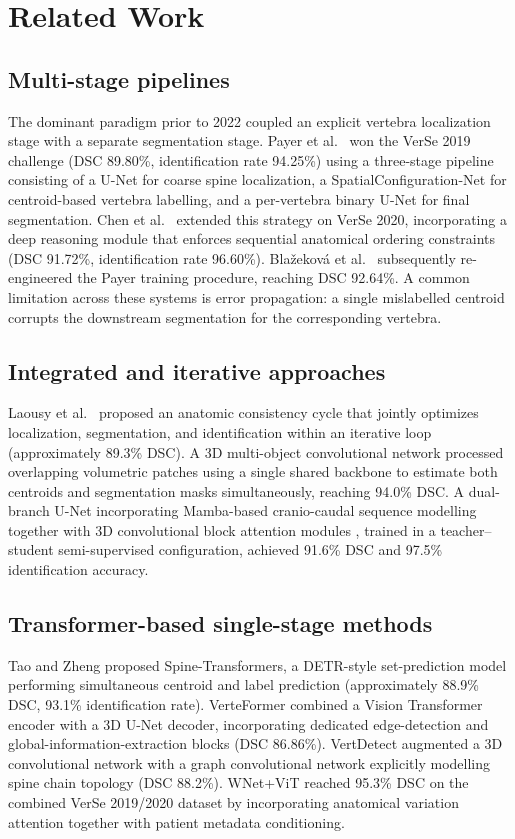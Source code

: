\documentclass[preprint,12pt,3p]{elsarticle}
\begin{document}
\section{Related Work}
\label{sec:related}

\subsection{Multi-stage pipelines}
The dominant paradigm prior to 2022 coupled an explicit vertebra localization stage with a separate segmentation stage. Payer et al.\ \cite{payer2020} won the VerSe 2019 challenge (DSC 89.80\%, identification rate 94.25\%) using a three-stage pipeline consisting of a U-Net for coarse spine localization, a SpatialConfiguration-Net for centroid-based vertebra labelling, and a per-vertebra binary U-Net for final segmentation. Chen et al.\ \cite{chen2020} extended this strategy on VerSe 2020, incorporating a deep reasoning module that enforces sequential anatomical ordering constraints (DSC 91.72\%, identification rate 96.60\%). Bla\v{z}ekov\'{a} et al.\ \cite{blazekova2023} subsequently re-engineered the Payer training procedure, reaching DSC 92.64\%. A common limitation across these systems is error propagation: a single mislabelled centroid corrupts the downstream segmentation for the corresponding vertebra.

\subsection{Integrated and iterative approaches}
Laousy et al.\ \cite{laousy2023} proposed an anatomic consistency cycle that jointly optimizes localization, segmentation, and identification within an iterative loop (approximately 89.3\% DSC). A 3D multi-object convolutional network \cite{tomography2024} processed overlapping volumetric patches using a single shared backbone to estimate both centroids and segmentation masks simultaneously, reaching 94.0\% DSC. A dual-branch U-Net incorporating Mamba-based cranio-caudal sequence modelling together with 3D convolutional block attention modules \cite{semimamba2026}, trained in a teacher--student semi-supervised configuration, achieved 91.6\% DSC and 97.5\% identification accuracy.

\subsection{Transformer-based single-stage methods}
Tao and Zheng \cite{tao2022} proposed Spine-Transformers, a DETR-style set-prediction model performing simultaneous centroid and label prediction (approximately 88.9\% DSC, 93.1\% identification rate). VerteFormer \cite{yang2023} combined a Vision Transformer encoder with a 3D U-Net decoder, incorporating dedicated edge-detection and global-information-extraction blocks (DSC 86.86\%). VertDetect \cite{vertdetect2023} augmented a 3D convolutional network with a graph convolutional network explicitly modelling spine chain topology (DSC 88.2\%). WNet+ViT \cite{montpetit2025} reached 95.3\% DSC on the combined VerSe 2019/2020 dataset by incorporating anatomical variation attention together with patient metadata conditioning.
\end{document}
